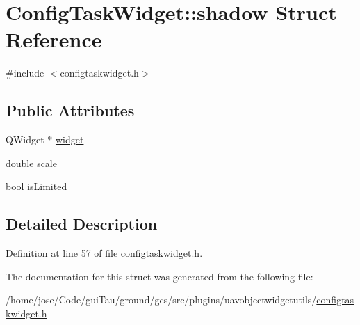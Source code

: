 \hypertarget{struct_config_task_widget_1_1shadow}{\section{Config\-Task\-Widget\-:\-:shadow Struct Reference}
\label{struct_config_task_widget_1_1shadow}
}


{\ttfamily \#include $<$configtaskwidget.\-h$>$}

\subsection*{Public Attributes}
\begin{DoxyCompactItemize}
\item 
Q\-Widget $\ast$ \hyperlink{group___u_a_v_object_widget_utils_ga06fc48ad3875446139f13fbb5b85cdcf}{widget}
\item 
\hyperlink{_super_l_u_support_8h_a8956b2b9f49bf918deed98379d159ca7}{double} \hyperlink{group___u_a_v_object_widget_utils_ga06ad87fdaa5af70d7239dda785c76f76}{scale}
\item 
bool \hyperlink{group___u_a_v_object_widget_utils_ga712acd84a5850623406835776b1840b4}{is\-Limited}
\end{DoxyCompactItemize}


\subsection{Detailed Description}


Definition at line 57 of file configtaskwidget.\-h.



The documentation for this struct was generated from the following file\-:\begin{DoxyCompactItemize}
\item 
/home/jose/\-Code/gui\-Tau/ground/gcs/src/plugins/uavobjectwidgetutils/\hyperlink{configtaskwidget_8h}{configtaskwidget.\-h}\end{DoxyCompactItemize}
